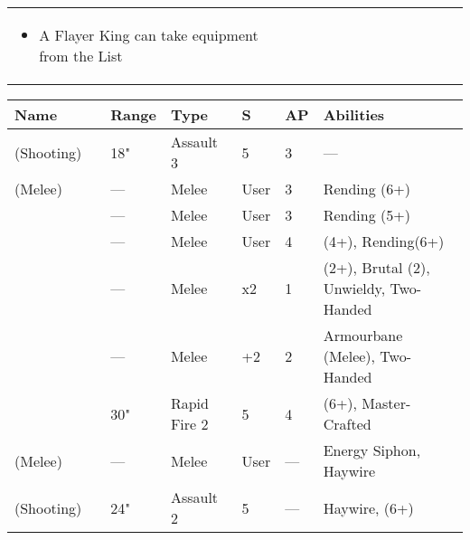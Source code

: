 \begin{tabular}{||m{10pt} m{90pt} m{30pt} m{11pt} m{11pt} m{11pt} m{11pt} m{11pt} m{11pt} m{11pt} m{11pt} m{11pt} m{11pt} m{135pt}||}
{\begin{itemize}
\begin{itemize}
				\item A \quickref{Resurrection Orb} \hrulefill X pt
				\item A \quickref{Sempiternal Weave} \hrulefill X pt
				\item A \quickref{Shadow Ankh} \hrulefill X pt
				\item A \quickref{Tesseract Labyrinth} \hrulefill X pt
				\item A \quickref{Translocation Shroud} \hrulefill X pt
			\end{itemize}
			\item A Flayer King can take equipment from the \quickref{Artefacts of the Aeons} List
	\end{itemize}} \\	
	
\end{tabular}

\noindent
\begin{tabular}{||m{110pt} m{30pt} m{31pt} m{55pt} m{12pt} m{12pt} m{210pt}||}
	\hline
	Name & & Range & Type & S & AP & Abilities \\
	\hline
	\quickref{Staff of Light} (Shooting) & & 18" & Assault 3 & 5 & 3 & — \\
	\quickref{Staff of Light} (Melee) & & — & Melee & User & 3 & Rending (6+) \\
	\quickref{Hyperphase Sword} &  & — & Melee & User & 3 & Rending (5+) \\
	\quickref{Voidblade} &  & — & Melee & User & 4 & \quickref{Entropic Strike} (4+), Rending(6+) \\
	\quickref{Voidscythe} &  & — & Melee & x2 & 1 & \quickref{Entropic Strike} (2+), Brutal (2), Unwieldy, Two-Handed \\
	\quickref{Warscythe} &  & — & Melee & +2 & 2 & Armourbane (Melee), Two-Handed \\
	\quickref{Relic Gauss Blaster} & & 30" & Rapid Fire 2 & 5 & 4 & \quickref{Gauss} (6+), Master-Crafted \\
	\quickref{Rod of Night} (Melee) & & — & Melee & User & — & Energy Siphon, Haywire \\
	\quickref{Rod of Night} (Shooting) & & 24" & Assault 2 & 5 & — & Haywire, \quickref{Tesla} (6+) \\
	\hline
\end{tabular}

